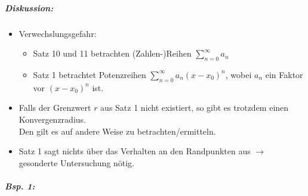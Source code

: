 \subparagraph{Diskussion:} 
\begin{itemize}
\item Verwechslungsgefahr:
\begin{itemize}
\item Satz 10 und 11 betrachten (Zahlen-)Reihen $\sum_{n=0}^\infty a_n$
\item Satz 1 betrachtet Potenzreihen $\sum_{n=0}^\infty a_n (x-x_0)^n$, wobei $a_n$ ein Faktor vor $(x-x_0)^n$ ist.
\end{itemize}
\item Falls der Grenzwert $r$ aus Satz 1 nicht existiert, so gibt es trotzdem einen Konvergenzradius.\\
Den gilt es auf andere Weise zu betrachten/ermitteln.
\item Satz 1 sagt nichts über das Verhalten an den Randpunkten aus $\rightarrow$ gesonderte Untersuchung nötig.
\end{itemize}
\subparagraph{Bsp. 1:} 
